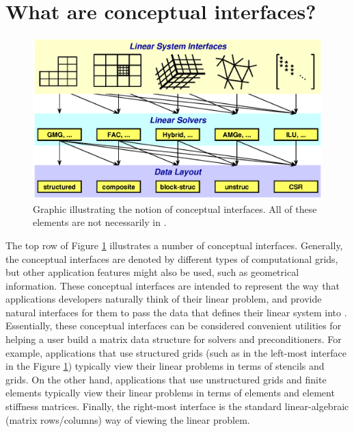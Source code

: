 
\section{What are conceptual interfaces?}
\label{What are conceptual interfaces}

\begin{figure}
\centering
\includegraphics[width=5in]{concep_iface.eps}
\caption{%
Graphic illustrating the notion of conceptual interfaces.
All of these elements are not necessarily in \hypre{}.}
\label{fig-conceptual-interface}
\end{figure}

The top row of Figure \ref{fig-conceptual-interface} illustrates a
number of conceptual interfaces.  Generally, the conceptual interfaces
are denoted by different types of computational grids, but other
application features might also be used, such as geometrical
information.  These conceptual interfaces are intended to represent
the way that applications developers naturally think of their linear
problem, and provide natural interfaces for them to pass the data that
defines their linear system into \hypre{}.  Essentially, these
conceptual interfaces can be considered convenient utilities for
helping a user build a matrix data structure for \hypre{} solvers and
preconditioners.  For example, applications that use structured grids
(such as in the left-most interface in the Figure
\ref{fig-conceptual-interface}) typically view their linear problems
in terms of stencils and grids.  On the other hand, applications that
use unstructured grids and finite elements typically view their linear
problems in terms of elements and element stiffness matrices.
Finally, the right-most interface is the standard linear-algebraic
(matrix rows/columns) way of viewing the linear problem.

